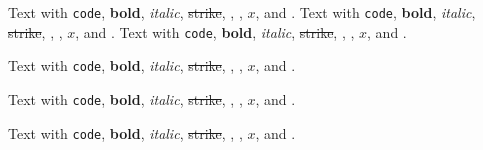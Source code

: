Text with \texttt{code}, \textbf{bold}, \emph{italic}, \sout{strike}, \cite{cite}, \parencite{a, b}, $x$, and .
Text with \texttt{code}, \textbf{bold}, \emph{italic}, \sout{strike}, \cite{cite}, \parencite{a, b}, $x$, and .
Text with \texttt{code}, \textbf{bold}, \emph{italic}, \sout{strike}, \cite{cite}, \parencite{a, b}, $x$, and .
\begin{frame}[t]
Text with \texttt{code}, \textbf{bold}, \emph{italic}, \sout{strike}, \cite{cite}, \parencite{a, b}, $x$, and .
\end{frame}

\begin{frame}[t]
Text with \texttt{code}, \textbf{bold}, \emph{italic}, \sout{strike}, \cite{cite}, \parencite{a, b}, $x$, and .
\end{frame}

\begin{frame}[t]
Text with \texttt{code}, \textbf{bold}, \emph{italic}, \sout{strike}, \cite{cite}, \parencite{a, b}, $x$, and .
\end{frame}

